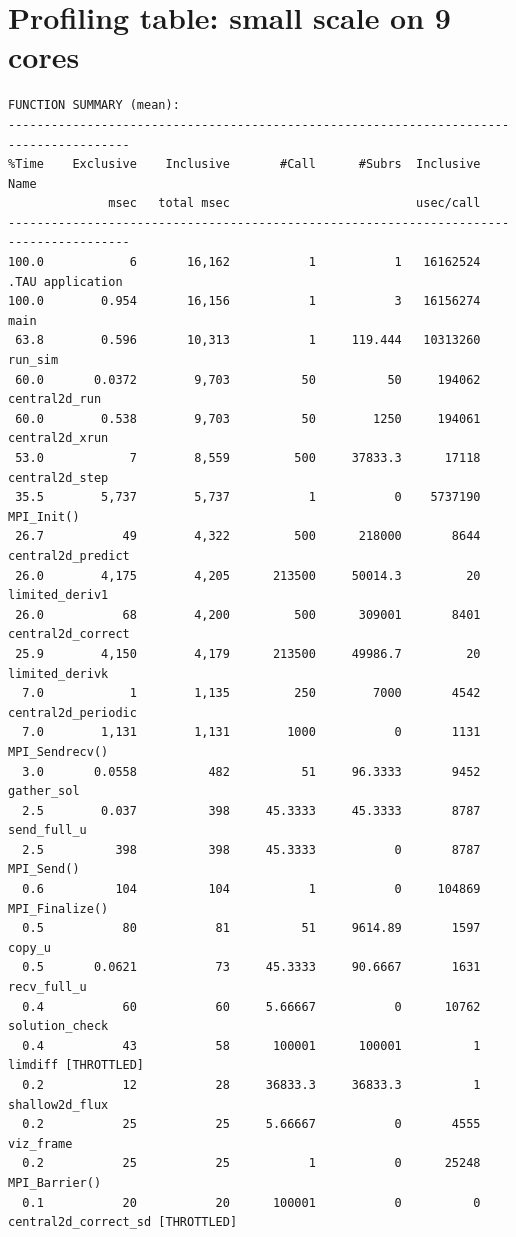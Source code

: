 \documentclass{article}
\begin{document}
\section{Profiling table: small scale on 9 cores}
\noindent
{\footnotesize
\begin{verbatim}
FUNCTION SUMMARY (mean):
---------------------------------------------------------------------------------------
%Time    Exclusive    Inclusive       #Call      #Subrs  Inclusive Name
              msec   total msec                          usec/call 
---------------------------------------------------------------------------------------
100.0            6       16,162           1           1   16162524 .TAU application
100.0        0.954       16,156           1           3   16156274 main 
 63.8        0.596       10,313           1     119.444   10313260 run_sim 
 60.0       0.0372        9,703          50          50     194062 central2d_run 
 60.0        0.538        9,703          50        1250     194061 central2d_xrun 
 53.0            7        8,559         500     37833.3      17118 central2d_step 
 35.5        5,737        5,737           1           0    5737190 MPI_Init() 
 26.7           49        4,322         500      218000       8644 central2d_predict 
 26.0        4,175        4,205      213500     50014.3         20 limited_deriv1 
 26.0           68        4,200         500      309001       8401 central2d_correct 
 25.9        4,150        4,179      213500     49986.7         20 limited_derivk 
  7.0            1        1,135         250        7000       4542 central2d_periodic 
  7.0        1,131        1,131        1000           0       1131 MPI_Sendrecv() 
  3.0       0.0558          482          51     96.3333       9452 gather_sol 
  2.5        0.037          398     45.3333     45.3333       8787 send_full_u 
  2.5          398          398     45.3333           0       8787 MPI_Send() 
  0.6          104          104           1           0     104869 MPI_Finalize() 
  0.5           80           81          51     9614.89       1597 copy_u 
  0.5       0.0621           73     45.3333     90.6667       1631 recv_full_u 
  0.4           60           60     5.66667           0      10762 solution_check 
  0.4           43           58      100001      100001          1 limdiff [THROTTLED]
  0.2           12           28     36833.3     36833.3          1 shallow2d_flux 
  0.2           25           25     5.66667           0       4555 viz_frame 
  0.2           25           25           1           0      25248 MPI_Barrier() 
  0.1           20           20      100001           0          0 central2d_correct_sd [THROTTLED]

\end{verbatim}}
\end{document}
